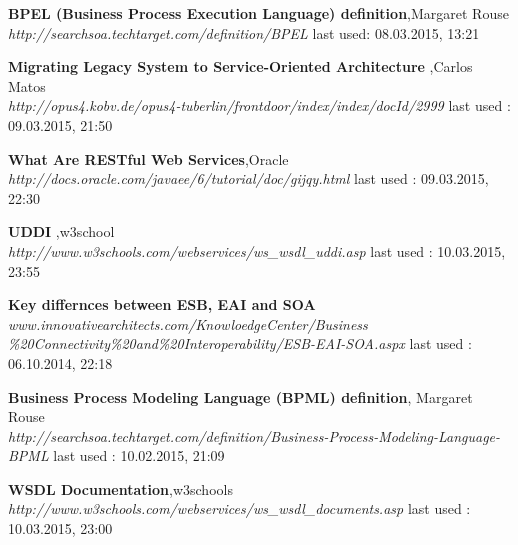\documentclass[12pt]{article}
\begin{document}
\begin{thebibliography}{56}
     
  
     
    


     


   \textbf{BPEL (Business Process Execution Language) definition},Margaret Rouse \\
  \textit{http://searchsoa.techtarget.com/definition/BPEL}
  \newline last used: 08.03.2015, 13:21

    \textbf{Migrating Legacy System to Service-Oriented Architecture },Carlos Matos\\
    \textit{http://opus4.kobv.de/opus4-tuberlin/frontdoor/index/index/docId/2999}
    \newline last used : 09.03.2015, 21:50

    \textbf{What Are RESTful Web Services},Oracle \\
    \textit{http://docs.oracle.com/javaee/6/tutorial/doc/gijqy.html}
    \newline last used : 09.03.2015, 22:30

    \textbf{UDDI },w3school\\
    \textit{http://www.w3schools.com/webservices/ws\_wsdl\_uddi.asp}
    \newline last used : 10.03.2015, 23:55

  


   \textbf{Key differnces between ESB, EAI and SOA}\\
  \textit{www.innovativearchitects.com/KnowloedgeCenter/Business \\ \%20Connectivity\%20and\%20Interoperability/ESB-EAI-SOA.aspx}
  \newline last used : 06.10.2014, 22:18



 	
   	  
   \textbf{Business Process Modeling Language (BPML) definition}, Margaret Rouse\\
  \textit{http://searchsoa.techtarget.com/definition/Business-Process-Modeling-Language-BPML}
  \newline last used : 10.02.2015, 21:09

   	\textbf{WSDL Documentation},w3schools \\
    \textit{http://www.w3schools.com/webservices/ws\_wsdl\_documents.asp}
    \newline last used : 10.03.2015, 23:00


\end{thebibliography}
\end{document}
